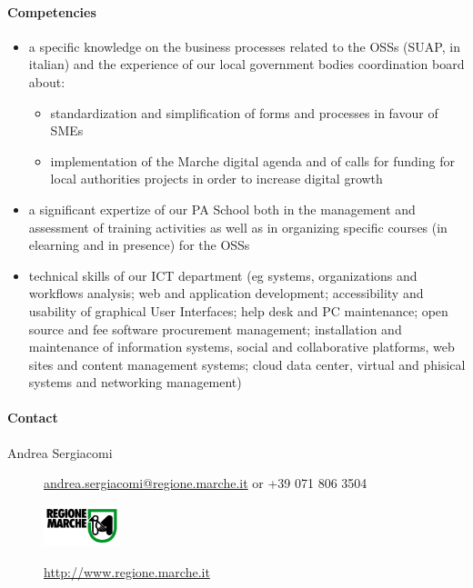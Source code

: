 \documentclass{learnpad}
\begin{document}
\paragraph{Competencies}
\begin{itemize}
	\item a specific knowledge on the business processes related to the OSSs
		(SUAP, in italian) and the experience of our local government bodies
		coordination board about:
		\begin{itemize}
			\item standardization and simplification of forms and processes in
				favour of SMEs
			\item implementation of the Marche digital agenda and of calls for
				funding for local authorities projects in order to increase
				digital growth
		\end{itemize}
	\item a significant expertize of our PA School both in the management and
		assessment of training activities as well as in organizing specific
		courses (in elearning and in presence) for the OSSs
	\item technical skills of our ICT department (eg systems, organizations and
		workflows analysis; web and application development; accessibility and
		usability of graphical User Interfaces; help desk and PC maintenance;
		open source and fee software procurement management; installation and
		maintenance of information systems, social and collaborative platforms,
		web sites and content management systems; cloud data center, virtual and
		phisical systems and networking management)
\end{itemize}

\paragraph{Contact}
\begin{description}
	\item[Andrea Sergiacomi] \href{mailto:andrea.sergiacomi@regione.marche.it}{andrea.sergiacomi@regione.marche.it} or +39 071 806 3504
\end{description}

\begin{figure}[!htp]
	\centering
	\includegraphics[width=6em,keepaspectratio]{figures/marche.jpg}\par
	\url{http://www.regione.marche.it}
\end{figure}
\end{document}
